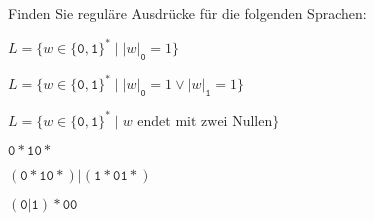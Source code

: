Finden Sie reguläre Ausdrücke für die folgenden Sprachen:
\begin{teilaufgaben}
\item
$L=\{w\in\{\texttt{0},\texttt{1}\}^*\mid |w|_{\texttt{0}}=1\}$
\item
$L=\{w\in\{\texttt{0},\texttt{1}\}^*\mid |w|_{\texttt{0}}=1\vee |w|_{\texttt{1}}=1\}$
\item
$L=\{w\in\{\texttt{0},\texttt{1}\}^*\mid \text{$w$ endet mit zwei Nullen}\}$
\end{teilaufgaben}

\begin{loesung}
\begin{teilaufgaben}
\item $\texttt{0}{*}\texttt{1}\texttt{0}*$
\item $
(\texttt{0}{*}\texttt{1}\texttt{0}*)|(\texttt{1}{*}\texttt{0}\texttt{1}*)
$
\item $(\texttt{0}|\texttt{1}){*}\texttt{00}$
\qedhere
\end{teilaufgaben}
\end{loesung}

